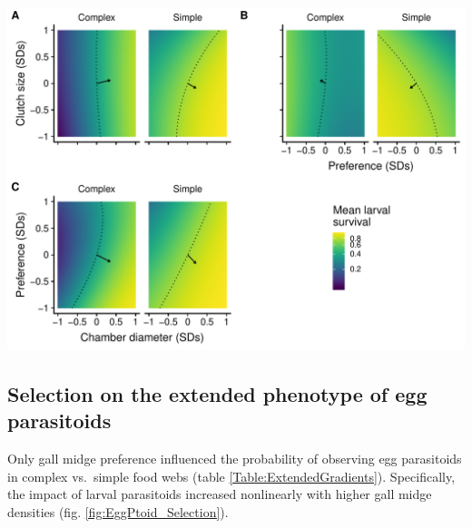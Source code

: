 \documentclass[11pt,]{article}
\let\origfigure\figure
\let\endorigfigure\endfigure
\renewenvironment{figure}[1][2] {
    \expandafter\origfigure\expandafter[H]
} {
    \endorigfigure
}
\begin{document}
\begin{figure}
\centering
\includegraphics{analyses/MV_landscapes.pdf}
\caption{\label{fig:MV_Landscape}Two dimensional view of adaptive
landscapes of gall midge phenotypes in complex vs.~simple food webs.
Each panel corresponds to a different combination of phenotypic traits:
clutch size and chamber diameter (A); clutch size and oviposition
preference (B); oviposition preference and chamber diameter (C). Arrows
represent mean estimates of directional selection gradients, while
contours represent predicted larval survival of the mean phenotype in
each food-web treatment. Notice that arrows point more toward a corner
of the adaptive landscape for each combination of traits in the simple
vs.~complex food-web treatment. This indicates that trait integration
(covariance) is more strongly favored in simpler vs.~more complex food
webs. Note that mean larval survival is plotted on a natural log scale
to reflect the mathematical definition of the adaptive landscape.}
\end{figure}

\subsection{Selection on the extended phenotype of egg
parasitoids}\label{selection-on-the-extended-phenotype-of-egg-parasitoids}

Only gall midge preference influenced the probability of observing egg
parasitoids in complex vs.~simple food webs (table
\ref{Table:ExtendedGradients}). Specifically, the impact of larval
parasitoids increased nonlinearly with higher gall midge densities (fig.
\ref{fig:EggPtoid_Selection}).
\end{document}
